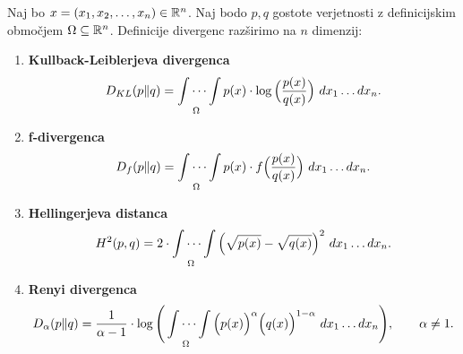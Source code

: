 \begin{zgled}
    Naj bo $x=(x_1, x_2, \dots , x_n) \in \mathbb{R}^n$. Naj bodo $p, q$ gostote verjetnosti z definicijskim območjem $\Omega \subseteq \mathbb{R}^n$. Definicije divergenc razširimo na $n$ dimenzij:
	\begin{enumerate}
		\item \textbf{Kullback-Leiblerjeva divergenca}
		\begin{equation}
			D_{KL}(p \| q) = \idotsint\limits_\Omega p(x) \cdot \log\Big(\frac{p(x)}{q(x)}\Big) \  dx_1\dots dx_n.
		\end{equation}
		\item \textbf{f-divergenca}
		\begin{equation}
			D_f(p \| q) = \idotsint\limits_\Omega p(x) \cdot f\Big(\frac{p(x)}{q(x)}\Big) \  dx_1\dots dx_n.
		\end{equation}
		\item \textbf{Hellingerjeva distanca}
		\begin{equation}
			H^2(p, q) = 2 \cdot \idotsint\limits_\Omega \Big(\sqrt{p(x)} - \sqrt{q(x)}\Big)^2 \  dx_1\dots dx_n.
		\end{equation}
		\item \textbf{Renyi divergenca}
		\begin{equation}
			D_{\alpha}(p \| q)=\frac{1}{\alpha-1} \cdot \log \Bigg(\idotsint\limits_\Omega \Big(p(x)\Big)^{\alpha}\Big(q(x)\Big)^{1-\alpha}\  dx_1\dots dx_n\Bigg), \quad \quad \alpha \neq 1.
		\end{equation}
	\end{enumerate}
\end{zgled}